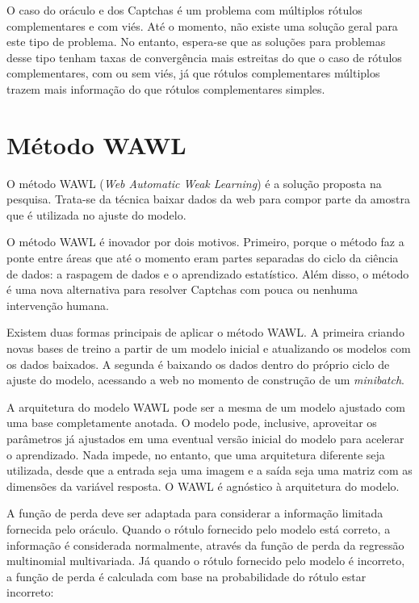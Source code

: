 \documentclass[12pt,twoside,brazilian]{book}
\begin{document}
O caso do oráculo e dos Captchas é um problema com múltiplos rótulos
complementares e com viés. Até o momento, não existe uma solução geral
para este tipo de problema. No entanto, espera-se que as soluções para
problemas desse tipo tenham taxas de convergência mais estreitas do que
o caso de rótulos complementares, com ou sem viés, já que rótulos
complementares múltiplos trazem mais informação do que rótulos
complementares simples.

\hypertarget{sec-wawl}{%
\section{Método WAWL}\label{sec-wawl}}

O método WAWL (\emph{Web Automatic Weak Learning}) é a solução proposta
na pesquisa. Trata-se da técnica baixar dados da web para compor parte
da amostra que é utilizada no ajuste do modelo.

O método WAWL é inovador por dois motivos. Primeiro, porque o método faz
a ponte entre áreas que até o momento eram partes separadas do ciclo da
ciência de dados: a raspagem de dados e o aprendizado estatístico. Além
disso, o método é uma nova alternativa para resolver Captchas com pouca
ou nenhuma intervenção humana.

Existem duas formas principais de aplicar o método WAWL. A primeira
criando novas bases de treino a partir de um modelo inicial e
atualizando os modelos com os dados baixados. A segunda é baixando os
dados dentro do próprio ciclo de ajuste do modelo, acessando a web no
momento de construção de um \emph{minibatch}.

A arquitetura do modelo WAWL pode ser a mesma de um modelo ajustado com
uma base completamente anotada. O modelo pode, inclusive, aproveitar os
parâmetros já ajustados em uma eventual versão inicial do modelo para
acelerar o aprendizado. Nada impede, no entanto, que uma arquitetura
diferente seja utilizada, desde que a entrada seja uma imagem e a saída
seja uma matriz com as dimensões da variável resposta. O WAWL é
agnóstico à arquitetura do modelo.

A função de perda deve ser adaptada para considerar a informação
limitada fornecida pelo oráculo. Quando o rótulo fornecido pelo modelo
está correto, a informação é considerada normalmente, através da função
de perda da regressão multinomial multivariada. Já quando o rótulo
fornecido pelo modelo é incorreto, a função de perda é calculada com
base na probabilidade do rótulo estar incorreto:
\end{document}
